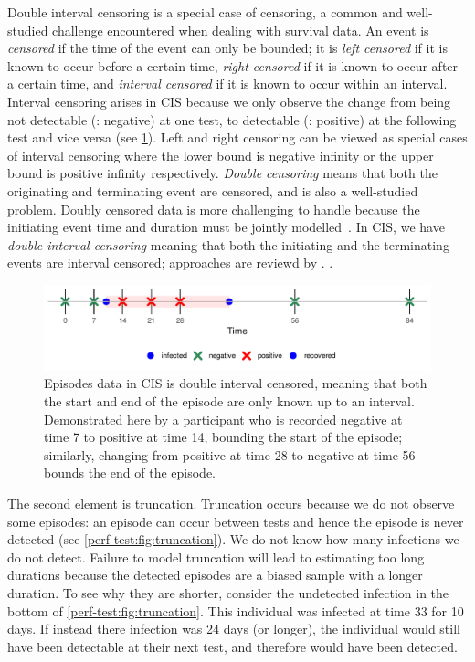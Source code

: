 \documentclass[thesis.tex]{subfiles}
\begin{document}
Double interval censoring is a special case of censoring, a common and well-studied challenge encountered when dealing with survival data.
An event is \emph{censored} if the time of the event can only be bounded; it is \emph{left censored} if it is known to occur before a certain time, \emph{right censored} if it is known to occur after a certain time, and \emph{interval censored} if it is known to occur within an interval.
Interval censoring arises in CIS because we only observe the change from being not detectable (\ie: negative) at one test, to detectable (\ie: positive) at the following test and vice versa (see \cref{perf-test:fig:double-interval-censor}).
Left and right censoring can be viewed as special cases of interval censoring where the lower bound is negative infinity or the upper bound is positive infinity respectively.
\emph{Double censoring} means that both the originating and terminating event are censored, and is also a well-studied problem.
Doubly censored data is more challenging to handle because the initiating event time and duration must be jointly modelled~\autocite[and references therein]{liSemiparametric}.
In CIS, we have \emph{double interval censoring} meaning that both the initiating and the terminating events are interval censored; approaches are reviewd by \textcite{sunAnalysis,bogaertsSurvival}.
.
\begin{figure}
  \centering \includegraphics{cis-perfect-testing/double-interval-censor}
  \caption[Double-interval censoring in CIS data]{Episodes data in CIS is double interval censored, meaning that both the start and end of the episode are only known up to an interval. Demonstrated here by a participant who is recorded negative at time 7 to positive at time 14, bounding the start of the episode; similarly, changing from positive at time 28 to negative at time 56 bounds the end of the episode. \label{perf-test:fig:double-interval-censor}}
\end{figure}

The second element is truncation.
Truncation occurs because we do not observe some episodes: an episode can occur between tests and hence the episode is never detected (see \cref{perf-test:fig:truncation}).
We do not know how many infections we do not detect.
Failure to model truncation will lead to estimating too long durations because the detected episodes are a biased sample with a longer duration.
To see why they are shorter, consider the undetected infection in the bottom of \cref{perf-test:fig:truncation}.
This individual was infected at time 33 for 10 days.
If instead there infection was 24 days (or longer), the individual would still have been detectable at their next test, and therefore would have been detected.
\end{document}
